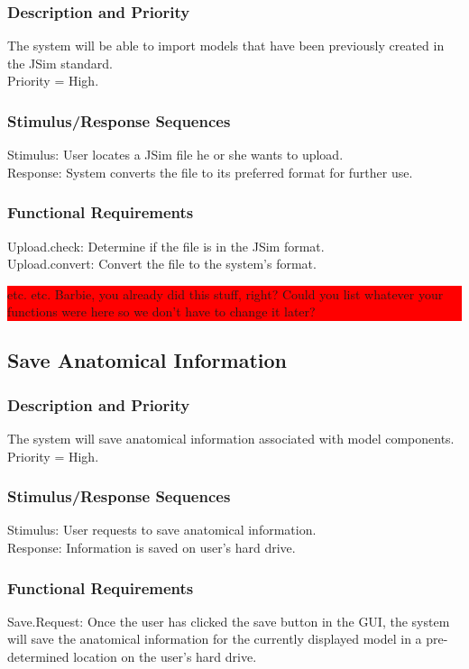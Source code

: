 \documentclass{article}
\newcommand{\todo}[1]{\colorbox{red}{\begin{minipage}{\textwidth}{#1}\end{minipage}}}
\begin{document}
\subsubsection{Description and Priority}
The system will be able to import models that have been previously created in the JSim standard.\\
Priority = High.

\subsubsection{Stimulus/Response Sequences}
Stimulus: User locates a JSim file he or she wants to upload.\\
Response: System converts the file to its preferred format for further use.

\subsubsection{Functional Requirements}
Upload.check: Determine if the file is in the JSim format.\\
Upload.convert: Convert the file to the system's format.

\todo{etc. etc. Barbie, you already did this stuff, right?  Could you list whatever your functions were here so we don't have to change it later?}

\subsection{Save Anatomical Information}
\subsubsection{Description and Priority}
The system will save anatomical information associated with model components.\\
Priority = High.

\subsubsection{Stimulus/Response Sequences}
Stimulus: User requests to save anatomical information.\\
Response: Information is saved on user's hard drive.

\subsubsection{Functional Requirements}
Save.Request: Once the user has clicked the save button in the GUI, the system will save the anatomical information for the currently displayed model in a pre-determined location on the user's hard drive.
\end{document}
